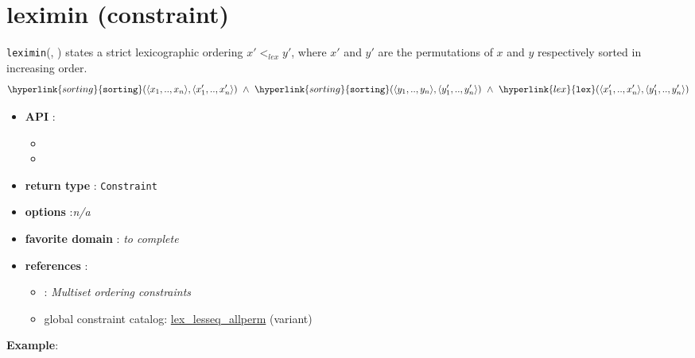 \label{leximin}
\hypertarget{leximin}{}

\section{leximin (constraint)}\label{leximin:leximinconstraint}\hypertarget{leximin:leximinconstraint}{}


\begin{notedef}
\texttt{leximin}(, ) states a strict lexicographic ordering $x'<_{lex} y'$, where $x'$ and $y'$ are the permutations of $x$ and $y$ respectively sorted in increasing order.
$$\hyperlink{sorting}{\texttt{sorting}}(\collec{x_1}{x_n},\collec{x'_1}{x'_n})\ \land\ \hyperlink{sorting}{\texttt{sorting}}(\collec{y_1}{y_n},\collec{y'_1}{y'_n})\ \land\ \hyperlink{lex}{\texttt{lex}}(\collec{x'_1}{x'_n},\collec{y'_1}{y'_n})$$

  \end{notedef}

\begin{itemize}
	\item \textbf{API} :
	\begin{itemize}
		\item {}
		\item {}
	\end{itemize}
	\item \textbf{return type} : \texttt{Constraint}
	\item \textbf{options} :\emph{n/a}
	\item \textbf{favorite domain} : \emph{to complete}
	\item \textbf{references} :
      \begin{itemize}
      \item \cite{FrischIJCAI03}: \emph{Multiset ordering constraints} 
      \item global constraint catalog: \href{http://www.emn.fr/x-info/sdemasse/gccat/Clex_lesseq_allperm.html}{lex\_lesseq\_allperm} (variant)
      \end{itemize}
\end{itemize}

\textbf{Example}:

